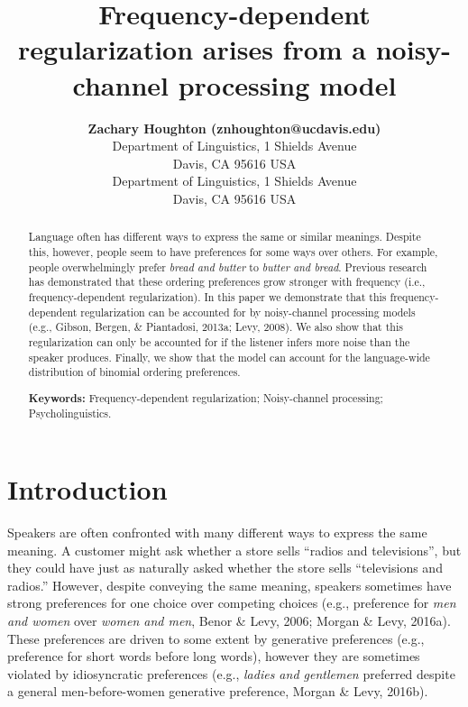 \documentclass[10pt, letterpaper]{article}
\title{Frequency-dependent regularization arises from a noisy-channel
processing model}
\author{{\large \bf Zachary Houghton (znhoughton@ucdavis.edu)} \\ Department of Linguistics, 1 Shields Avenue \\ Davis, CA 95616 USA \AND {\large \bf Emily Morgan (eimorgan@ucdavis.edu)} \\ Department of Linguistics, 1 Shields Avenue \\ Davis, CA 95616 USA}
\begin{document}
\maketitle

\begin{abstract}
Language often has different ways to express the same or similar
meanings. Despite this, however, people seem to have preferences for
some ways over others. For example, people overwhelmingly prefer
\emph{bread and butter} to \emph{butter and bread}. Previous research
has demonstrated that these ordering preferences grow stronger with
frequency (i.e., frequency-dependent regularization). In this paper we
demonstrate that this frequency-dependent regularization can be
accounted for by noisy-channel processing models (e.g., Gibson, Bergen,
\& Piantadosi, 2013a; Levy, 2008). We also show that this regularization
can only be accounted for if the listener infers more noise than the
speaker produces. Finally, we show that the model can account for the
language-wide distribution of binomial ordering preferences.

\textbf{Keywords:}
Frequency-dependent regularization; Noisy-channel processing;
Psycholinguistics.
\end{abstract}


\hypertarget{introduction}{%
\section{Introduction}\label{introduction}}

Speakers are often confronted with many different ways to express the
same meaning. A customer might ask whether a store sells ``radios and
televisions'', but they could have just as naturally asked whether the
store sells ``televisions and radios.'' However, despite conveying the
same meaning, speakers sometimes have strong preferences for one choice
over competing choices (e.g., preference for \emph{men and women} over
\emph{women and men}, Benor \& Levy, 2006; Morgan \& Levy, 2016a). These
preferences are driven to some extent by generative preferences (e.g.,
preference for short words before long words), however they are
sometimes violated by idiosyncratic preferences (e.g., \emph{ladies and
gentlemen} preferred despite a general men-before-women generative
preference, Morgan \& Levy, 2016b).
\end{document}
